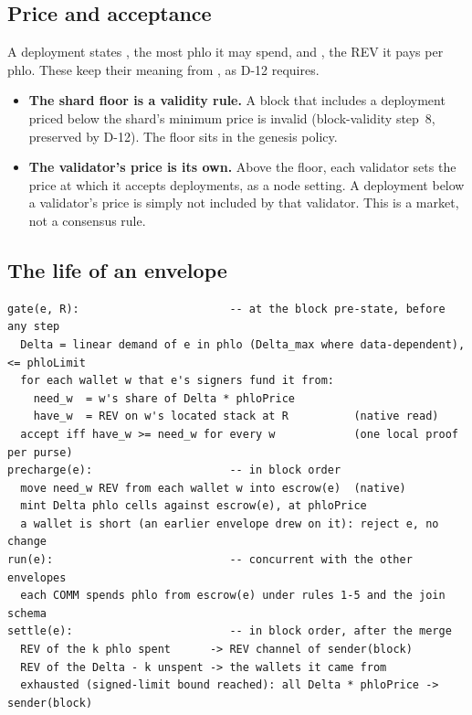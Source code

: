 \documentclass[11pt]{article}
\newcommand{\code}{\path}
\begin{document}
\subsection{Price and acceptance}

A deployment states \code{phloLimit}, the most phlo it may spend, and \code{phloPrice}, the REV it pays per phlo. These keep their meaning from \code{dev}, as D-12 requires.
\begin{itemize}
\item \textbf{The shard floor is a validity rule.} A block that includes a deployment priced below the shard's minimum price is invalid (block-validity step~8, preserved by D-12). The floor sits in the genesis policy.
\item \textbf{The validator's price is its own.} Above the floor, each validator sets the price at which it accepts deployments, as a node setting. A deployment below a validator's price is simply not included by that validator. This is a market, not a consensus rule.
\end{itemize}

\subsection{The life of an envelope}

\begin{Verbatim}[fontsize=\footnotesize,frame=single,framesep=6pt]
gate(e, R):                       -- at the block pre-state, before any step
  Delta = linear demand of e in phlo (Delta_max where data-dependent), <= phloLimit
  for each wallet w that e's signers fund it from:
    need_w  = w's share of Delta * phloPrice
    have_w  = REV on w's located stack at R          (native read)
  accept iff have_w >= need_w for every w            (one local proof per purse)
precharge(e):                     -- in block order
  move need_w REV from each wallet w into escrow(e)  (native)
  mint Delta phlo cells against escrow(e), at phloPrice
  a wallet is short (an earlier envelope drew on it): reject e, no change
run(e):                           -- concurrent with the other envelopes
  each COMM spends phlo from escrow(e) under rules 1-5 and the join schema
settle(e):                        -- in block order, after the merge
  REV of the k phlo spent      -> REV channel of sender(block)
  REV of the Delta - k unspent -> the wallets it came from
  exhausted (signed-limit bound reached): all Delta * phloPrice -> sender(block)
\end{Verbatim}
\end{document}
